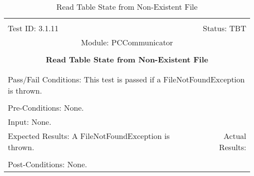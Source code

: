 \documentclass[titlepage]{article}
\begin{document}
\begin{center}%
\begin{table}
\begin{tabular}{|l r|}\hline&\\[-2mm]
	Test ID: 3.1.11	&Status: TBT\\[-3mm]
	\multicolumn{2}{|c|}{Module: PCCommunicator}\\&\\
	\multicolumn{2}{|c|}{\textbf{\large{Read Table State from Non-Existent File}}}\\&\\\hline&\\[-3mm]
	\multicolumn{2}{|p{\textwidth}|}{Pass/Fail Conditions: This test is passed if a FileNotFoundException is thrown.}\\[1mm]\hline&\\[-3mm]
	\multicolumn{2}{|p{\textwidth}|}{Pre-Conditions: None.}\\[4mm]
	\multicolumn{2}{|p{\textwidth}|}{Input: None.}\\[2mm]\hline
	\multicolumn{1}{|p{0.49\textwidth}}{Expected Results: A FileNotFoundException is thrown.}	&\multicolumn{1}{|p{0.45\textwidth}|}{Actual Results: }\\\hline&\\[-3mm]
	\multicolumn{2}{|p{\textwidth}|}{Post-Conditions: None.}\\\hline
\end{tabular}
\caption{Read Table State from Non-Existent File}
\end{table}
\end{center}
\end{document}
